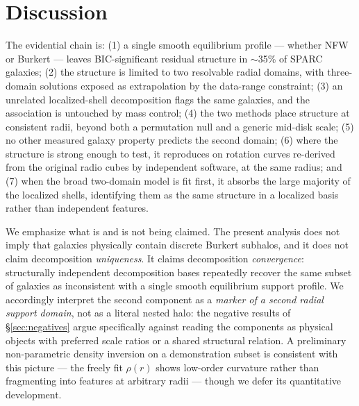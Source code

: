 \documentclass[twocolumn]{aastex631}
\begin{document}
\section{Discussion} \label{sec:discussion}

The evidential chain is: (1) a single smooth equilibrium profile ---
whether NFW or Burkert --- leaves BIC-significant residual structure in
$\sim$35\% of SPARC galaxies; (2) the structure is limited to two resolvable
radial domains, with three-domain solutions exposed as extrapolation by the
data-range constraint; (3) an unrelated localized-shell decomposition flags
the same galaxies, and the association is untouched by mass control; (4) the
two methods place structure at consistent radii, beyond both a permutation
null and a generic mid-disk scale; (5) no other measured galaxy property
predicts the second domain; (6) where the structure is strong enough to test,
it reproduces on rotation curves re-derived from the original radio cubes by
independent software, at the same radius; and (7) when the broad two-domain
model is fit first, it absorbs the large majority of the localized shells,
identifying them as the same structure in a localized basis rather than
independent features.

We emphasize what is and is not being claimed. The present analysis does not
imply that galaxies physically contain discrete Burkert subhalos, and it does
not claim decomposition \emph{uniqueness}. It claims decomposition
\emph{convergence}: structurally independent decomposition bases repeatedly
recover the same subset of galaxies as inconsistent with a single smooth
equilibrium support profile. We accordingly interpret the second component as
a \emph{marker of a second radial support domain}, not as a literal nested
halo: the negative results of \S\ref{sec:negatives} argue specifically
against reading the components as physical objects with preferred scale
ratios or a shared structural relation. A preliminary non-parametric density
inversion on a demonstration subset is consistent with this picture --- the
freely fit $\rho(r)$ shows low-order curvature rather than fragmenting into
features at arbitrary radii --- though we defer its quantitative development.
\end{document}
